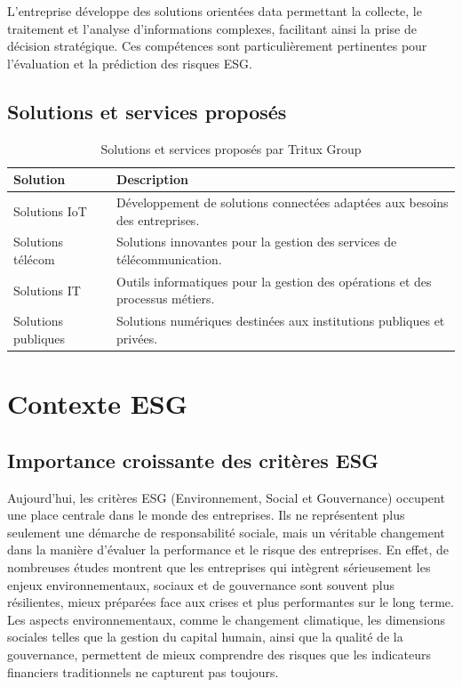 L'entreprise développe des solutions orientées data permettant la collecte, le
traitement et l'analyse d'informations complexes, facilitant ainsi la prise de décision
stratégique. Ces compétences sont particulièrement pertinentes pour l'évaluation et la
prédiction des risques ESG.

\subsection{Solutions et services proposés}

\begin{table}[H]
\centering
\caption{Solutions et services proposés par Tritux Group}
\begin{tabular}{|p{4cm}|p{9cm}|}
\hline
\textbf{Solution} & \textbf{Description} \\
\hline
Solutions IoT & Développement de solutions connectées adaptées aux besoins des entreprises. \\
\hline
Solutions télécom & Solutions innovantes pour la gestion des services de télécommunication. \\
\hline
Solutions IT & Outils informatiques pour la gestion des opérations et des processus métiers. \\
\hline
Solutions publiques & Solutions numériques destinées aux institutions publiques et privées. \\
\hline
\end{tabular}
\label{tab:solutions_tritux}
\end{table}

\section{Contexte ESG}
\label{sec:contexte_esg}

\subsection{Importance croissante des critères ESG}

Aujourd'hui, les critères ESG (Environnement, Social et Gouvernance) occupent une place
centrale dans le monde des entreprises. Ils ne représentent plus seulement une démarche
de responsabilité sociale, mais un véritable changement dans la manière d'évaluer la
performance et le risque des entreprises. En effet, de nombreuses études montrent que
les entreprises qui intègrent sérieusement les enjeux environnementaux, sociaux et de
gouvernance sont souvent plus résilientes, mieux préparées face aux crises et plus
performantes sur le long terme.\cite{dougan2025credit}
\newline
Les aspects environnementaux, comme le changement
climatique, les dimensions sociales telles que la gestion du capital humain, ainsi que
la qualité de la gouvernance, permettent de mieux comprendre des risques que les
indicateurs financiers traditionnels ne capturent pas toujours.


